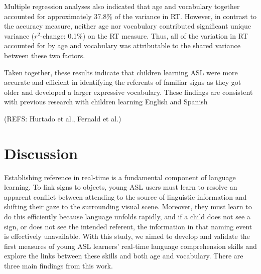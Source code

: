 \documentclass[12pt,]{article}
\begin{document}
Multiple regression analyses also indicated that age and vocabulary
together accounted for approximately 37.8\% of the variance in RT.
However, in contrast to the accuracy measure, neither age nor vocabulary
contributed significant unique variance (\(r^2\)-change: 0.1\%) on the
RT measure. Thus, all of the variation in RT accounted for by age and
vocabulary was attributable to the shared variance between these two
factors.

Taken together, these results indicate that children learning ASL were
more accurate and efficient in identifying the referents of familiar
signs as they got older and developed a larger expressive vocabulary.
These findings are consistent with previous research with children
learning English and Spanish

(REFS: Hurtado et al., Fernald et al.)

\section{Discussion}\label{discussion}

Establishing reference in real-time is a fundamental component of
language learning. To link signs to objects, young ASL users must learn
to resolve an apparent conflict between attending to the source of
linguistic information and shifting their gaze to the surrounding visual
scene. Moreover, they must learn to do this efficiently because language
unfolds rapidly, and if a child does not see a sign, or does not see the
intended referent, the information in that naming event is effectively
unavailable. With this study, we aimed to develop and validate the first
measures of young ASL learners' real-time language comprehension skills
and explore the links between these skills and both age and vocabulary.
There are three main findings from this work.
\end{document}
